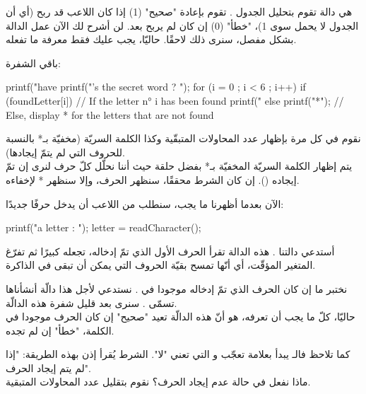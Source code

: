 هي دالة تقوم بتحليل الجدول
.
تقوم بإعادة "صحيح" (1) إذا كان اللاعب قد ربح (أي أن الجدول
لا يحمل سوى 1)، "خطأ" (0) إن كان لم يربح بعد.
لن أشرح لك الآن عمل الدالة بشكل مفصل، سنرى ذلك لاحقًا. حاليّا، يجب عليك فقط معرفة ما تفعله.

باقي الشفرة:

\begin{Csource}
printf("\n\nYou have %
printf("\nWhat's the secret word ? ");
for (i = 0 ; i < 6 ; i++)
{
  if (foundLetter[i]) // If the letter n° i has been found
    printf("%
  else
    printf("*"); // Else, display * for the letters that are not found
}
\end{Csource}

نقوم في كل مرة بإظهار عدد المحاولات المتبقّية وكذا الكلمة السريّة (مخفيّة بـ* بالنسبة للحروف التي لم يتمّ إيجادها).\\
يتم إظهار الكلمة السريّة المخفيّة بـ* بفضل حلقة
حيث أننا نحلّل كلّ حرف لنرى إن تمّ إيجاده
().
إن كان الشرط محققًا، سنظهر الحرف، وإلا سنظهر * لإخفاءه.

الآن بعدما أظهرنا ما يجب، سنطلب من اللاعب أن يدخل حرفًا جديدًا:

\begin{Csource}
printf("\nSuggest a letter : ");
letter = readCharacter();
\end{Csource}

أستدعي دالتنا
.
هذه الدالة تقرأ الحرف الأول الذي تمّ إدخاله، تجعله  كبيرًا ثم تفرّغ المتغير المؤقّت، أي أنّها تمسح بقيّة الحروف التي يمكن أن تبقى في الذاكرة.

\begin{Csource}
// if it's NOT the right letter
if (!findLetter(letter, secretWord, foundLetter))
  {
    remainingTries--; // Decrement the remaining tries
  }
}
\end{Csource}

نختبر ما إن كان الحرف الذي تمّ إدخاله موجودا في
.
نستدعي لأجل هذا دالّة أنشأناها تسمّى
.
سنرى بعد قليل شفرة هذه الدالّة.\\
حاليّا، كلّ ما يجب أن تعرفه، هو أنّ هذه الدالّة تعيد "صحيح" إن كان الحرف موجودا في الكلمة، "خطأ" إن لم تجده.

كما تلاحظ فالـ
يبدأ بعلامة تعجّب
\InlineCode{!}
و التي تعني "لا". الشرط يُقرأ إذن بهذه الطريقة: "إذا لم يتم إيجاد الحرف".\\
ماذا نفعل في حالة عدم إيجاد الحرف؟ نقوم بتقليل عدد المحاولات المتبقية.

